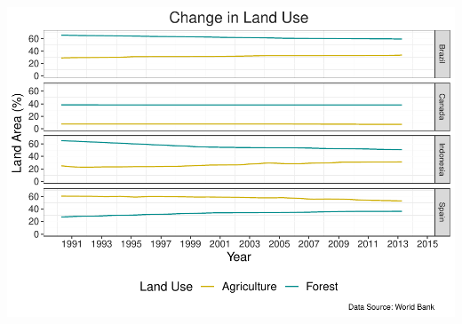 \documentclass[12pt,]{article}
\begin{document}
\includegraphics{Marx_ENV872_Project_files/figure-latex/unnamed-chunk-5-1.pdf}
\end{document}
